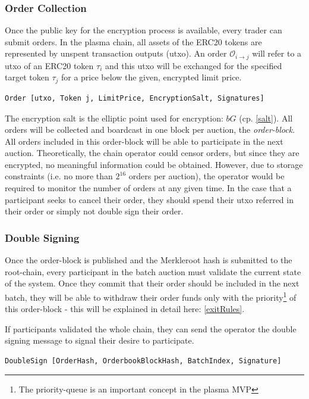 \documentclass[11pt,parskip=full]{scrartcl}%
\def\pO{\mathcal{O}}
\def\ra{\rightarrow}
\newcommand*{\erc}{ERC20 }
\begin{document}
\subsubsection{Order Collection}
\label{orderblock}
Once the public key for the encryption process is available, every trader can submit orders. 
In the plasma chain, all assets of the ERC20 tokens are represented by unspent transaction outputs (utxo). 
An order $\pO_{i\ra j}$ will refer to a utxo of an \erc token $\tau_i$ and this utxo will be exchanged for the specified target token $\tau_j$ for a price below the given, encrypted limit price. 

\begin{verbatim}
Order [utxo, Token j, LimitPrice, EncryptionSalt, Signatures]
\end{verbatim} 

The encryption salt is the elliptic point used for encryption:  $bG$ (cp. \ref{salt}). 
All orders will be collected and boardcast in one block per auction, the \emph{order-block}. 
All orders included in this order-block will be able to participate in the next auction. 
Theoretically, the chain operator could censor orders, but since they are encrypted, no meaningful information could be obtained.
However, due to storage constraints (i.e. no more than $2^{16}$ orders per auction), the operator would be required to monitor the number of orders at any given time.
In the case that a participant seeks to cancel their order, they should spend their utxo referred in their order or simply not double sign their order. 

\subsubsection{Double Signing}
Once the order-block is published and the Merkleroot hash is submitted to the root-chain, every participant in the batch auction must validate the current state of the system. 
Once they commit that their order should be included in the next batch, they will be able to withdraw their order funds only with the priority\footnote{The priority-queue is an important concept in the plasma MVP} of this order-block - this will be explained in detail here: \ref{exitRules}.

If participants validated the whole chain, they can send the operator the double signing message to signal their desire to participate. 
\begin{verbatim}
DoubleSign [OrderHash, OrderbookBlockHash, BatchIndex, Signature]
\end{verbatim}
\end{document}

